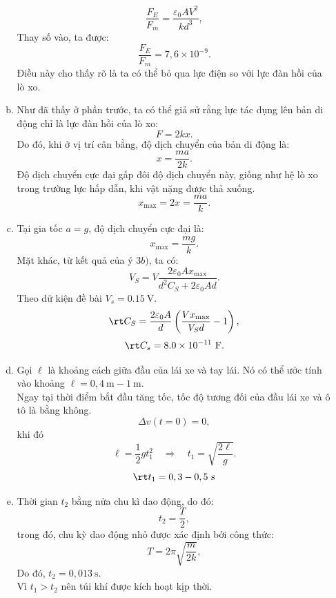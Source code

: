 \begin{loigiai}
\begin{enumerate}[1)]
\begin{enumerate}[a)]
        \[\dfrac{F_E}{F_m} = \dfrac{\varepsilon_0 AV^2}{kd^3},\]
        Thay số vào, ta được:
        \[\dfrac{F_{E}}{F_{m}} = 7,6 \times 10^{-9}.\]
        Điều này cho thấy rõ là ta có thể bỏ qua lực điện so với lực đàn hồi của lò xo.
        \item Như đã thấy ở phần trước, ta có thể giả sử rằng lực tác dụng lên bản di động chỉ là lực đàn hồi của lò xo:
        \[F = 2kx.\]
        Do đó, khi ở vị trí cân bằng, độ dịch chuyển của bản  di động là:
        \[x = \dfrac{ma}{2k}.\]
        Độ dịch chuyển cực đại gấp đôi độ dịch chuyển này, giống như hệ lò xo trong trường lực hấp dẫn, khi vật nặng được thả xuống.
        \[x_{\max} = 2x = \dfrac{ma}{k}.\]
        \item Tại gia tốc $a=g$, độ dịch chuyển cực đại là:
        \[x_{\max} = \dfrac{mg}{k}.\]
        Mặt khác, từ kết quả của ý $3b)$, ta có:
        \[V_{S}=V \dfrac{2 \varepsilon_{0} A x_{\max }}{d^{2} C_{S} + 2 \varepsilon_{0} A d}.\]
        Theo dữ kiện đề bài $V_s = 0.15 ~\mathrm{V}$.
        \[\rt C_{S} = \dfrac{2 \varepsilon_{0} A}{d}\left(\dfrac{V x_{\max }}{V_{S} d}-1\right),\]
        \[\rt C_{s}=8.0 \times 10^{-11} \mathrm{~F}. \]
        \item Gọi $\ell$ là khoảng cách giữa đầu của lái xe và tay lái. Nó có thể ước tính vào khoảng $\ell = 0,4 ~\mathrm{m} - 1 ~\mathrm{m}$.\\
        Ngay tại thời điểm bắt đầu tăng tốc, tốc độ tương đối của đầu lái xe và ô tô là bằng không.
        \[\Delta v(t=0)=0,\]
        khi đó
        \[\ell=\dfrac{1}{2} g t_{1}^{2} \quad \Rightarrow \quad t_{1}=\sqrt{\dfrac{2 \ell}{g}}.\]
        \[\rt t_{1} = 0,3 - 0,5 \mathrm{~s}\]
        \item Thời gian $t_2$ bằng nửa chu kì dao động, do đó:
        \[t_{2}=\dfrac{T}{2},\]
        trong đó, chu kỳ dao động nhỏ được xác định bởi công thức:
        \[T=2 \pi \sqrt{\dfrac{m}{2 k}},\]
        Do đó, $t_2 = 0,013 \mathrm{~s}$.\\
        Vì $t_1>t_2$ nên túi khí được kích hoạt kịp thời.
    \end{enumerate}
\end{enumerate}
\end{loigiai}

